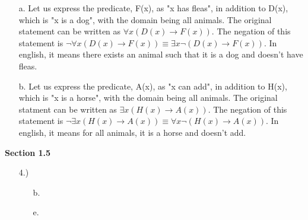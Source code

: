\documentclass{article}
\begin{document}
\begin{enumerate}
\begin{enumerate}

\item[a.] Let us express the predicate, F(x), as "x has fleas", in addition to D(x), which is "x is a dog", with the domain being all animals. The original statement can be written as $\forall x ( D(x) \rightarrow F(x) )$. The negation of this statement is $\neg \forall x (D(x) \rightarrow F(x) ) \equiv \exists x \neg (D(x) \rightarrow F(x))$. In english, it means there exists an animal such that it is a dog and doesn't have fleas.

\item[b.] Let us express the predicate, A(x), as "x can add", in addition to H(x), which is "x is a horse", with the domain being all animals. The original statment can be written as $\exists x ( H(x) \rightarrow A(x) )$. The negation of this statement is $\neg \exists x (H(x) \rightarrow A(x)) \equiv \forall x \neg (H(x) \rightarrow A(x))$. In english, it means for all animals, it is a horse and doesn't add. 

\end{enumerate}

\end{enumerate}

\textbf{Section 1.5}

\begin{enumerate}

\item[4.)]

\begin{enumerate}

\item[b.]

\item[e.]

\end{enumerate}

\end{enumerate}
\end{document}
